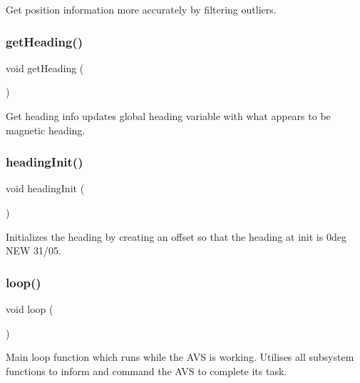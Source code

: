 Get position information more accurately by filtering outliers. 

\mbox{\label{bot_main_8ino_a5609bff11340150a4f8ae053b35f2d83}} 
\subsubsection{\texorpdfstring{get\+Heading()}{getHeading()}}
{\footnotesize\ttfamily void get\+Heading (\begin{DoxyParamCaption}{ }\end{DoxyParamCaption})}



Get heading info updates global heading variable with what appears to be magnetic heading. 

\mbox{\label{bot_main_8ino_a69409a63f3546ae3a73b1dd0b8231c6f}} 
\subsubsection{\texorpdfstring{heading\+Init()}{headingInit()}}
{\footnotesize\ttfamily void heading\+Init (\begin{DoxyParamCaption}{ }\end{DoxyParamCaption})}



Initializes the heading by creating an offset so that the heading at init is 0deg N\+EW 31/05. 

\mbox{\label{bot_main_8ino_afe461d27b9c48d5921c00d521181f12f}} 
\subsubsection{\texorpdfstring{loop()}{loop()}}
{\footnotesize\ttfamily void loop (\begin{DoxyParamCaption}{ }\end{DoxyParamCaption})}

Main loop function which runs while the A\+VS is working. Utilises all subsystem functions to inform and command the A\+VS to complete its task. \mbox{\label{bot_main_8ino_a39321c04c34c4c2e46ed14803bdddd39}} 
